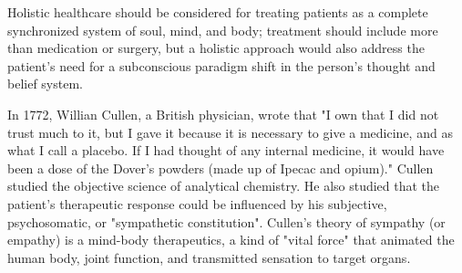\documentclass[12pt, a4paper]{article}
\begin{document}
Holistic healthcare should be considered for treating patients as a complete synchronized system of soul, mind, and body; treatment should include more than medication or surgery, but a holistic approach would also address the patient's need for a subconscious paradigm shift in the person's thought and belief system.\cite{Kobisi2012}\cite{Lipton2015}


In 1772, Willian Cullen, a British physician, wrote that  "I own that I did not trust much to it, but I gave it because it is necessary to give a medicine, and as what I call a placebo. If I had thought of any internal medicine, it would have been a dose of the Dover's powders (made up of Ipecac and opium)."\cite{Kerr2008}\cite{Finniss2018}
Cullen studied the objective science of analytical chemistry. He also studied that the patient's therapeutic response could be influenced by his
subjective, psychosomatic, or "sympathetic constitution"\cite{Kerr2008}.
Cullen's theory of sympathy (or empathy) is a mind-body therapeutics, a kind of "vital force" that animated the human body, joint function, and transmitted sensation to target organs\cite{Forget2003}\cite{Kerr2008}.
\end{document}
